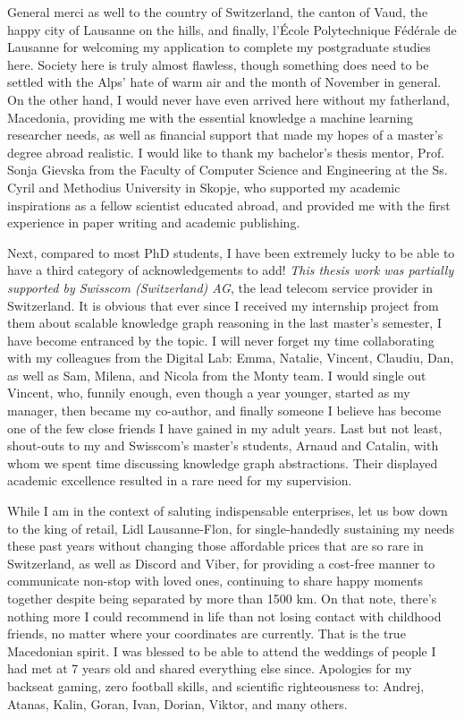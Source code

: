 General merci as well to the country of Switzerland, the canton of Vaud, the happy city of Lausanne on the hills, and finally, l'École Polytechnique Fédérale de Lausanne for welcoming my application to complete my postgraduate studies here. Society here is truly almost flawless, though something does need to be settled with the Alps' hate of warm air and the month of November in general. On the other hand, I would never have even arrived here without my fatherland, Macedonia, providing me with the essential knowledge a machine learning researcher needs, as well as financial support that made my hopes of a master's degree abroad realistic. I would like to thank my bachelor's thesis mentor, Prof. Sonja Gievska from the Faculty of Computer Science and Engineering at the Ss. Cyril and Methodius University in Skopje, who supported my academic inspirations as a fellow scientist educated abroad, and provided me with the first experience in paper writing and academic publishing.

Next, compared to most PhD students, I have been extremely lucky to be able to have a third category of acknowledgements to add! \emph{This thesis work was partially supported by Swisscom (Switzerland) AG}, the lead telecom service provider in Switzerland. It is obvious that ever since I received my internship project from them about scalable knowledge graph reasoning in the last master's semester, I have become entranced by the topic. I will never forget my time collaborating with my colleagues from the Digital Lab: Emma, Natalie, Vincent, Claudiu, Dan, as well as Sam, Milena, and Nicola from the Monty team. I would single out Vincent, who, funnily enough, even though a year younger, started as my manager, then became my co-author, and finally someone I believe has become one of the few close friends I have gained in my adult years. Last but not least, shout-outs to my and Swisscom's master's students, Arnaud and Catalin, with whom we spent time discussing knowledge graph abstractions. Their displayed academic excellence resulted in a rare need for my supervision. 

While I am in the context of saluting indispensable enterprises, let us bow down to the king of retail, Lidl Lausanne-Flon, for single-handedly sustaining my needs these past years without changing those affordable prices that are so rare in Switzerland, as well as Discord and Viber, for providing a cost-free manner to communicate non-stop with loved ones, continuing to share happy moments together despite being separated by more than 1500 km. On that note, there's nothing more I could recommend in life than not losing contact with childhood friends, no matter where your coordinates are currently. That is the true Macedonian spirit. I was blessed to be able to attend the weddings of people I had met at 7 years old and shared everything else since. Apologies for my backseat gaming, zero football skills, and scientific righteousness to: Andrej, Atanas, Kalin, Goran, Ivan, Dorian, Viktor, and many others.

